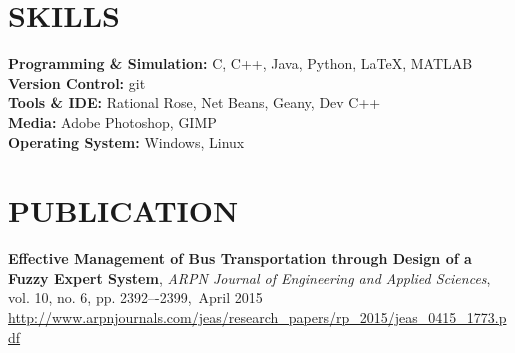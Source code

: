 \documentclass[margin, 10pt]{res} %
\begin{document}
\begin{resume}
\section{SKILLS} 
{\textbf{Programming \& Simulation:}} C, C++, Java, Python, \LaTeX  , MATLAB  \\
{\textbf{Version Control:}} git  \\
{\textbf{Tools \& IDE:}} Rational Rose, Net Beans, Geany, Dev C++  \\
{\textbf{Media:}} Adobe Photoshop, GIMP  \\
{\textbf{Operating System:}} Windows, Linux  \\
\section{PUBLICATION}
\textbf{
Effective Management of Bus Transportation through Design of a Fuzzy Expert System},
\emph{ARPN Journal of Engineering and Applied Sciences}, vol. 10, no. 6, pp. 2392–-2399,\, April 2015 \\
\url{http://www.arpnjournals.com/jeas/research_papers/rp_2015/jeas_0415_1773.pdf}


\end{resume}
\end{document}
